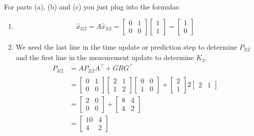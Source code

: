 \documentclass[letterpaper]{article}
\begin{document}
For parts (a), (b) and (c) you just plug into the formulas:\\
\begin{enumerate}
\setlength{\itemsep}{.15in}
\renewcommand{\labelenumi}{(\alph{enumi})}
\item
\begin{equation*}
  \widehat{x}_{3|2}=A\widehat{x}_{2|2}=\left[ \begin{array}{rr} 0 & 1\\ 0 & 0\end{array} \right]\left[ \begin{array}{c} 1 \\ 1\end{array} \right]
            =\left[ \begin{array}{c} 1 \\ 0\end{array} \right]
\end{equation*}
\item  We need the last line in the time update or prediction step to determine $ P_{3|2}$ and the first line in the measurement update to determine $K_3$.
\begin{align*}
P_{3|2} &= A P_{2|2} A^\top + G R G^\top \\
&= \left[ \begin{array}{rr} 0 & 1\\ 0 & 0\end{array} \right] \left[ \begin{array}{rr}2 &  1\\ 1&  2\end{array} \right] \left[ \begin{array}{rr} 0 & 0\\1 & 0\end{array} \right] +\left[ \begin{array}{c} 2\\ 1\end{array} \right]2\left[ \begin{array}{cc} 2& 1\end{array} \right]\\
&=\left[ \begin{array}{rr} 2 & 0\\ 0& 0\end{array} \right] + \left[ \begin{array}{rr} 8 & 4\\ 4 & 2\end{array} \right] \\
&= \left[ \begin{array}{rr} 10 & 4\\ 4 & 2\end{array} \right]\\[5 mm]

\end{align*}
\end{enumerate}
\end{document}
